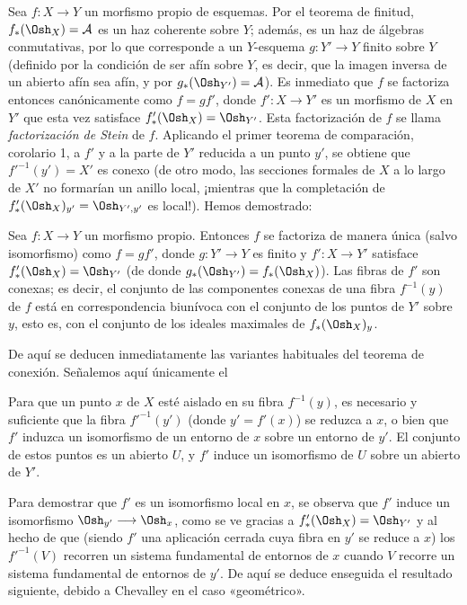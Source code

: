 Sea $f:X\longrightarrow Y$ un morfismo propio de esquemas. Por el teorema de
finitud, $f_*(\Osh_X)=\mathcal A$ es un haz coherente sobre $Y$; además, es un
haz de álgebras conmutativas, por lo que corresponde a un $Y$-esquema
$g:Y'\longrightarrow Y$ finito sobre $Y$ (definido por la condición de ser afín
sobre $Y$, es decir, que la imagen inversa de un abierto afín sea afín, y por
$g_*(\Osh_{Y'})=\mathcal A$). Es inmediato que $f$ se factoriza entonces
canónicamente como $f=gf'$, donde $f':X\longrightarrow Y'$ es un morfismo de
$X$ en $Y'$ que esta vez satisface $f'_*(\Osh_X)=\Osh_{Y'}$. Esta factorización
de $f$ se llama \emph{factorización de Stein} de $f$. Aplicando el primer
teorema de comparación, corolario 1, a $f'$ y a la parte de $Y'$ reducida a un
punto $y'$, se obtiene que $f'^{-1}(y')=X'$ es conexo (de otro modo, las
secciones formales de $X$ a lo largo de $X'$ no formarían un anillo local,
¡mientras que la completación de
$f'_*(\Osh_X)_{y'}=\Osh_{Y',y'}$ es local!). Hemos demostrado:

 Sea
$f:X\longrightarrow Y$ un morfismo propio. Entonces $f$ se factoriza de manera
única (salvo isomorfismo) como $f=gf'$, donde $g:Y'\longrightarrow Y$ es finito
y $f':X\longrightarrow Y'$ satisface $f'_*(\Osh_X)=\Osh_{Y'}$ (de donde
$g_*(\Osh_{Y'})=f_*(\Osh_X)$). Las fibras de $f'$ son conexas; es decir, el
conjunto de las componentes conexas de una fibra $f^{-1}(y)$ de $f$ está en
correspondencia biunívoca con el conjunto de los puntos de $Y'$ sobre $y$, esto
es, con el conjunto de los ideales maximales de $f_*(\Osh_X)_y$.

De aquí se deducen inmediatamente las variantes habituales del teorema de
conexión. Señalemos aquí únicamente el

 Para que un punto $x$ de $X$ esté aislado en su fibra
$f^{-1}(y)$, es necesario y suficiente que la fibra $f'^{-1}(y')$ (donde
$y'=f'(x)$) se reduzca a $x$, o bien que $f'$ induzca un isomorfismo de un
entorno de $x$ sobre un entorno de $y'$. El conjunto de estos puntos es un
abierto $U$, y $f'$ induce un isomorfismo de $U$ sobre un abierto de $Y'$.

Para demostrar que $f'$ es un isomorfismo local en $x$, se observa que $f'$
induce un isomorfismo $\Osh_{y'}\longrightarrow\Osh_x$, como se ve gracias a
$f'_*(\Osh_X)=\Osh_{Y'}$ y al hecho de que (siendo $f'$ una aplicación cerrada
cuya fibra en $y'$ se reduce a $x$) los $f'^{-1}(V)$ recorren un sistema
fundamental de entornos de $x$ cuando $V$ recorre un sistema fundamental de
entornos de $y'$. De aquí se deduce enseguida el resultado siguiente, debido a
Chevalley en el caso «geométrico».

